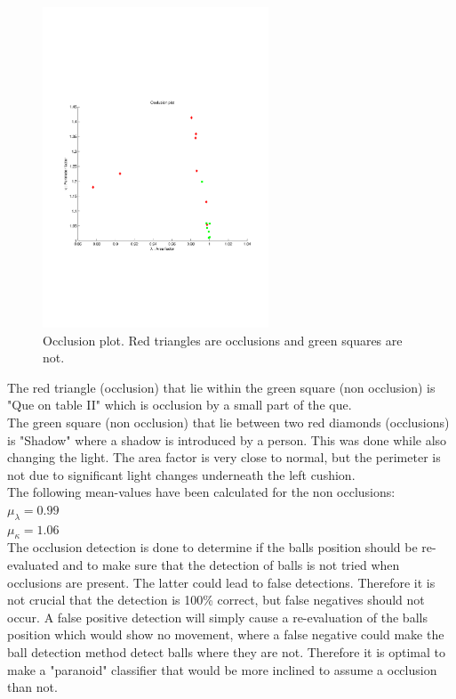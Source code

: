 \begin{figure}[H]
\begin{center}
\leavevmode
\includegraphics[width=0.6\textwidth]{images/occlusion_plot}
\end{center}
\caption{Occlusion plot. Red triangles are occlusions and green squares are not.}
\label{fig:occlusion_plot}
\end{figure}

The red triangle (occlusion) that lie within the green square (non occlusion) is "Que on table II" which is occlusion by a small part of the que.\\

The green square (non occlusion) that lie between two red diamonds (occlusions) is "Shadow" where a shadow is introduced by a person. This was done while also changing the light. The area factor is very close to normal, but the perimeter is not due to significant light changes underneath the left cushion.\\

The following mean-values have been calculated for the non occlusions:\\

$\mu_{\lambda} = 0.99$\\
$\mu_{\kappa} = 1.06$\\

The occlusion detection is done to determine if the balls position should be re-evaluated and to make sure that the detection of balls is not tried when occlusions are present. The latter could lead to false detections. Therefore it is not crucial that the detection is 100\% correct, but false negatives should not occur. A false positive detection will simply cause a re-evaluation of the balls position which would show no movement, where a false negative could make the ball detection method detect balls where they are not. Therefore it is optimal to make a "paranoid" classifier that would be more inclined to assume a occlusion than not.\\

